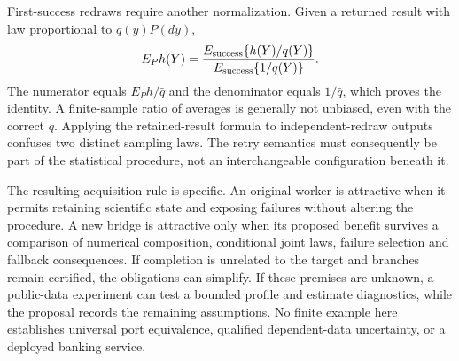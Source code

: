 First-success redraws require another normalization. Given a returned result
with law proportional to $q(y)P(dy)$,
\begin{equation}
 E_P h(Y)=
 \frac{E_{\rm success}\{h(Y)/q(Y)\}}
      {E_{\rm success}\{1/q(Y)\}}.
 \label{exec17:s9-redraw-weighting}
\end{equation}
The numerator equals $E_P h/\bar q$ and the denominator equals $1/\bar q$,
which proves the identity. A finite-sample ratio of averages is generally
not unbiased, even with the correct $q$. Applying the retained-result
formula to independent-redraw outputs confuses two distinct sampling laws.
The retry semantics must consequently be part of the statistical procedure,
not an interchangeable configuration beneath it.

The resulting acquisition rule is specific. An original worker is attractive
when it permits retaining scientific state and exposing failures without
altering the procedure. A new bridge is attractive only when its proposed
benefit survives a comparison of numerical composition, conditional joint
laws, failure selection and fallback consequences. If completion is unrelated
to the target and branches remain certified, the obligations can simplify.
If these premises are unknown, a public-data experiment can test a bounded
profile and estimate diagnostics, while the proposal records the remaining
assumptions. No finite example here establishes universal port equivalence,
qualified dependent-data uncertainty, or a deployed banking service.
